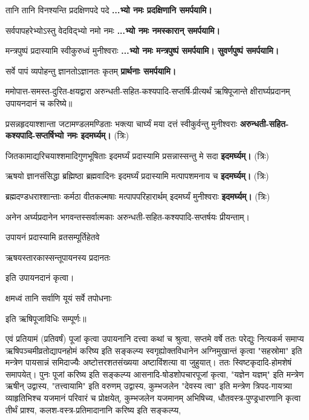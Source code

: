 {तानि तानि विनश्यन्ति प्रदक्षिणपदे पदे}
\textbf{...भ्यो नमः प्रदक्षिणानि समर्पयामि।}

{सर्वपापहरेभ्योऽस्तु वेदविद्भ्यो नमो नमः}
\textbf{...भ्यो नमः नमस्कारान् समर्पयामि।}

{मन्त्रपुष्पं प्रदास्यामि स्वीकुरुध्वं मुनीश्वराः}
\textbf{...भ्यो नमः मन्त्रपुष्पं समर्पयामि। सुवर्णपुष्पं समर्पयामि।}


{सर्वे पापं व्यपोहन्तु ज्ञानतोऽज्ञानतः कृतम्}
\textbf{प्रार्थनाः समर्पयामि।}

\resetShloka
ममोपात्त-समस्त-दुरित-क्षयद्वारा अरुन्धती-सहित-कश्यपादि-सप्तर्षि-प्रीत्यर्थं
ऋषिपूजान्ते क्षीरार्घ्यप्रदानम् उपायनदानं च करिष्ये॥

\twolineshloka
{प्रसन्नहृदयाश्शान्ता जटामण्डलमण्डिताः}
{भक्त्या चार्घ्यं मया दत्तं स्वीकुर्वन्तु मुनीश्वराः}
\textbf{अरुन्धती-सहित-कश्यपादि-सप्तर्षिभ्यो नमः इदमर्घ्यम्।} (त्रिः)

\twolineshloka
{जितकामाद्यरिचयाश्शमादिगुणभूषिताः}
{इदमर्घ्यं प्रदास्यामि प्रसन्नास्सन्तु मे सदा}
\textbf{इदमर्घ्यम्।} (त्रिः)

\twolineshloka
{ऋषयो ज्ञानसंसिद्धा ब्रह्मिष्ठा ब्रह्मवादिनः}
{इदमर्घ्यं प्रदास्यामि मत्पापशमनाय च}
\textbf{इदमर्घ्यम्।} (त्रिः)

\twolineshloka
{ब्रह्मदण्डधराश्शान्ताः कर्मठा वीतकल्मषाः}
{मत्पापपरिहारार्थम् इदमर्घ्यं मुनीश्वराः}
\textbf{इदमर्घ्यम्।} (त्रिः)

अनेन अर्घ्यप्रदानेन भगवन्तस्सर्वात्मकाः अरुन्धती-सहित-कश्यपादि-सप्तर्षयः प्रीयन्ताम्।


{उपायनं प्रदास्यामि व्रतसम्पूर्तिहेतवे}

{ऋषयस्तारकास्सन्तूपायनस्य प्रदानतः}

इति उपायनदानं कृत्वा।

{क्षमध्वं तानि सर्वाणि यूयं सर्वे तपोधनाः}

इति ऋषिपूजाविधिः सम्पूर्णः॥


एवं प्रतियामं (प्रतिवर्षं) पूजां कृत्वा उपायनानि दत्त्वा कथां च श्रुत्वा, सप्तमे
वर्षे ततः परेद्युः नित्यकर्म समाप्य ऋषिपञ्चमीव्रतोद्यापनहोमं करिष्य इति सङ्कल्प्य
स्वगृह्योक्तविधानेन अग्निमुखान्तं कृत्वा "सहस्रोमा" इति मन्त्रेण पायसान्नं
समिदाज्यैः अष्टोत्तरशतसंख्यया अष्टाविंशत्या वा जुहुयात्। ततः स्विष्टकृदादि-होमशेषं
समापयेत्। पुनः पूजां करिष्य इति सङ्कल्प्य आसनादि-षोडशोपचारपूजां कृत्वा,
"यज्ञेन यज्ञम्" इति मन्त्रेण ऋषीन् उद्वास्य, "तत्त्वायामि" इति वरुणम् उद्वास्य,
कुम्भजलेन "देवस्य त्वा" इति मन्त्रेण त्रिपद-गायत्र्या व्याहृतिभिश्च यजमानं
परिवारं च प्रोक्षयेत्, कुम्भजलेन यजमानम् अभिषिच्य, धौतवस्त्र-पुण्ड्रधारणानि कृत्वा
तीर्थं प्राश्य, कलश-वस्त्र-प्रतिमादानानि करिष्य इति सङ्कल्प्य,

